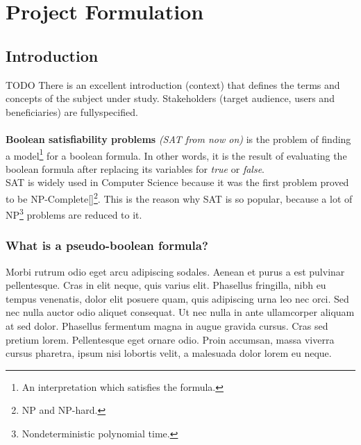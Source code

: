 
\chapter{Project Formulation} %

\label{Chapter1} %


\section{Introduction}

TODO
There is an excellent introduction
(context) that defines the terms
and concepts of the subject under
study. Stakeholders (target audience, users and beneficiaries)
are fullyspecified.
\\
\\
\textbf{Boolean satisfiability problems} \textit{(SAT from now on)} is the problem of finding a model\footnote{An interpretation which satisfies the formula.} for a boolean formula. In other words, it is the result of evaluating the boolean formula after replacing its variables for \emph{true} or \emph{false}. 
\\
SAT is widely used in Computer Science because it was the first problem proved to be NP-Complete[\cite{Cook1971}]\footnote{NP and NP-hard.}. This is the reason why SAT is so popular, because a lot of NP\footnote{Nondeterministic polynomial time.} problems are reduced to it.


\subsection{What is a pseudo-boolean formula?}
Morbi rutrum odio eget arcu adipiscing sodales. Aenean et purus a est pulvinar pellentesque. Cras in elit neque, quis varius elit. Phasellus fringilla, nibh eu tempus venenatis, dolor elit posuere quam, quis adipiscing urna leo nec orci. Sed nec nulla auctor odio aliquet consequat. Ut nec nulla in ante ullamcorper aliquam at sed dolor. Phasellus fermentum magna in augue gravida cursus. Cras sed pretium lorem. Pellentesque eget ornare odio. Proin accumsan, massa viverra cursus pharetra, ipsum nisi lobortis velit, a malesuada dolor lorem eu neque.

